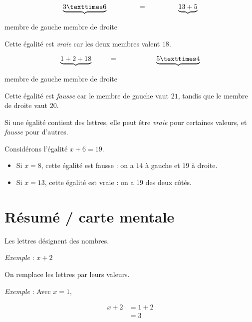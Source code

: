 \documentclass[a4paper,11pt]{article}
\newcommand{\myimportantbox}[3][]{
	\begin{myimportantboxinternal}[
		frametitlebackgroundcolor=#2!70,
		frametitlerulecolor=#2,
		#1]
		#3
	\end{myimportantboxinternal}
}
\begin{document}
\begin{exemple}
	$$ \underbrace{3 × 6} \hspace{4.5em} = \hspace{4.5em} \underbrace{13 + 5} $$
	\begin{center}
		membre de gauche \hspace{3em} membre de droite
	\end{center}

	Cette égalité est \textit{vraie} car les deux membres valent $18$. \vspace{1em}

	$$ \underbrace{1 + 2 + 18} \hspace{2.5em} = \hspace{5.5em} \underbrace{5 × 4} $$
	\begin{center}
		membre de gauche \hspace{3em} membre de droite
	\end{center}

	Cette égalité est \textit{fausse} car le membre de gauche vaut $21$, tandis que le membre de droite vaut $20$.
\end{exemple}

\begin{cours}
	Si une égalité contient des lettres, elle peut être \textit{vraie} pour certaines valeurs, et \textit{fausse} pour d'autres.
\end{cours}

\begin{exemple}
	Considérons l'égalité $x + 6 = 19$.
	\begin{itemize}
		\item Si $x = 8$, cette égalité est fausse : on a $14$ à gauche et $19$ à droite.
		\item Si $x = 13$, cette égalité est vraie : on a $19$ des deux côtés.
	\end{itemize}
\end{exemple}

\section*{Résumé / carte mentale}

\myimportantbox[frametitle={Expression littérale}]{cyan}{
	Les lettres désignent des nombres.

	\textit{Exemple} : $x + 2$
}

\myimportantbox[frametitle={Calcul de la valeur d'une expression littérale}]{orange}{
	On remplace les lettres par leurs valeurs.

	\textit{Exemple} : Avec $x = 1$,

	\begin{align*}
		x + 2 & = 1 + 2 \\
		      & = 3
	\end{align*}
}
\end{document}
